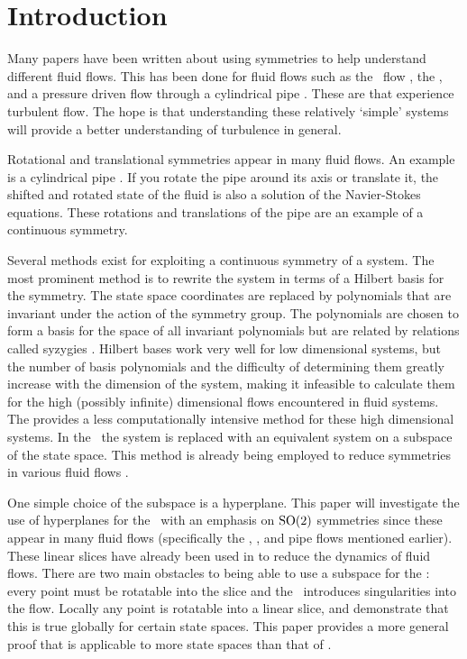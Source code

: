 \section{Introduction}
\label{sect:intro}

Many papers have been written about using symmetries to help understand different fluid flows. This has been done for fluid flows such as the \KS\ flow , the {\pCf} , and a pressure driven flow through a cylindrical pipe . These are  that experience turbulent flow. The hope is that understanding these relatively `simple' systems will provide a better understanding of turbulence in general.

Rotational and translational symmetries appear in many fluid flows. An example is a cylindrical pipe . If you rotate the pipe around its axis or translate it, the shifted and rotated state of the fluid is also a solution of the Navier-Stokes equations. These rotations and translations of the pipe are an example of a continuous symmetry.

Several methods exist for exploiting a continuous symmetry of a system. The most prominent method is to rewrite the system in terms of a Hilbert basis for the symmetry. The state space coordinates are replaced by polynomials that are invariant under the action of the symmetry group. The polynomials are chosen to form a basis for the space of all invariant polynomials but are related by relations called syzygies . Hilbert bases work very well for low dimensional systems, but the number of basis polynomials and the difficulty of determining them greatly increase with the dimension of the system, making it infeasible to calculate them for the high (possibly infinite) dimensional flows encountered in fluid systems. The \mslices{} provides a less computationally intensive method for these high dimensional systems. In the \mslices\ the system is replaced with an equivalent system on a subspace of the state space. This method is already being employed to reduce symmetries in various fluid flows .

One simple choice of the subspace is a hyperplane. This paper will investigate the use of hyperplanes for the \mslices\ with an emphasis on $\textrm{SO}(2)$ symmetries since these appear in many fluid flows (specifically the \KS, {\pCf}, and pipe flows mentioned earlier). These linear slices have already been used in  to reduce the dynamics of fluid flows.
There are two main obstacles to being able to use a subspace for the \mslices: every point must be rotatable into the slice and the \mslices\ introduces singularities into the flow.
Locally any point is rotatable into a linear slice, and  demonstrate that this is true globally for certain state spaces. This paper provides a more general proof that is applicable to more state spaces than that of .

